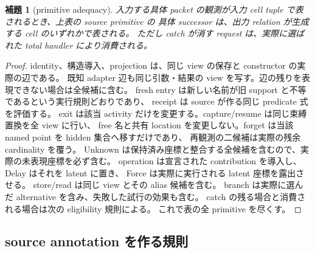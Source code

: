 \documentclass[11pt,a4paper]{article}
\newtheorem{lemma}[theorem]{補題}
\theoremstyle{remark}
\begin{document}
\begin{lemma}[primitive adequacy]
入力する具体 packet の観測が入力 cell tuple で表されるとき、上表の source primitive の
具体 successor は、出力 relation が生成する cell のいずれかで表される。
ただし catch が消す request は、実際に選ばれた total handler により消費される。
\end{lemma}
\begin{proof}
identity、構造導入、projection は、同じ view の保存と constructor の実際の辺である。
既知 adapter 辺も同じ引数・結果の view を写す。辺の残りを表現できない場合は全候補に含む。
fresh entry は新しい名前が旧 support と不等であるという実行規則どおりであり、
receipt は source が作る同じ predicate 式を評価する。
exit は該当 activity だけを変更する。capture/resume は同じ束縛置換を全 view に行い、
free 名と共有 location を変更しない。forget は当該 named point を hidden 集合へ移すだけであり、
再観測の二候補は実際の残余 cardinality を覆う。
Unknown は保持済み座標と整合する全候補を含むので、実際の未表現座標を必ず含む。
operation は宣言された contribution を導入し、Delay はそれを latent に置き、
Force は実際に実行される latent 座標を露出させる。
store/read は同じ view とその alias 候補を含む。
branch は実際に選んだ alternative を含み、失敗した試行の効果も含む。
catch の残る場合と消費される場合は次の eligibility 規則による。
これで表の全 primitive を尽くす。\qedhere
\end{proof}

\subsection{source annotation を作る規則}
\end{document}

